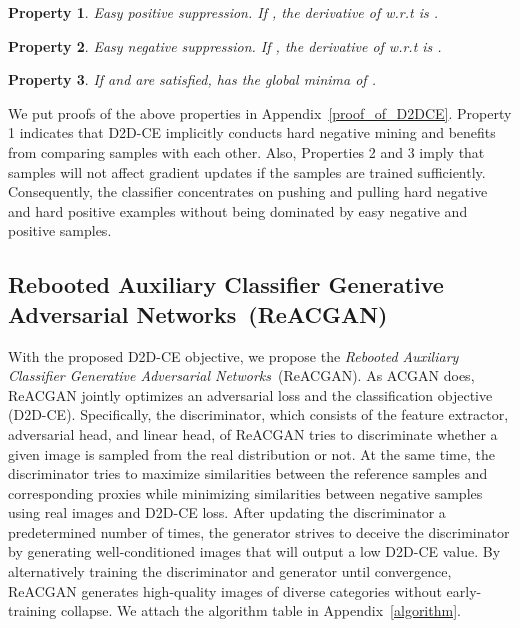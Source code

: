 \documentclass{article}
\newtheorem{property}{Property}
\begin{document}
\begin{property}
Easy positive suppression.
If , the derivative of   w.r.t  is .
\end{property}

\begin{property}
Easy negative suppression. 
If , the derivative of   w.r.t  is .
\end{property}

\begin{property}
If  and  are satisfied,  has the global minima of .
\end{property}

We put proofs of the above properties in Appendix~\ref{proof_of_D2DCE}. Property 1 indicates that D2D-CE implicitly conducts hard negative mining and benefits from comparing samples with each other. Also, Properties 2 and 3 imply that samples will not affect gradient updates if the samples are trained sufficiently. Consequently, the classifier concentrates on pushing and pulling hard negative and hard positive examples without being dominated by easy negative and positive samples.

\subsection{Rebooted Auxiliary Classifier Generative Adversarial Networks~(ReACGAN)}
With the proposed D2D-CE objective, we propose the \textit{Rebooted Auxiliary Classifier Generative Adversarial Networks}~(ReACGAN). As ACGAN does, ReACGAN jointly optimizes an adversarial loss and the classification objective (D2D-CE). Specifically, the discriminator, which consists of the feature extractor, adversarial head, and linear head, of ReACGAN tries to discriminate whether a given image is sampled from the real distribution or not. At the same time, the discriminator tries to maximize similarities between the reference samples and corresponding proxies while minimizing similarities between negative samples using real images and D2D-CE loss. After updating the discriminator a predetermined number of times, the generator strives to deceive the discriminator by generating well-conditioned images that will output a low D2D-CE value. By alternatively training the discriminator and generator until convergence, ReACGAN generates high-quality images of diverse categories without early-training collapse. We attach the algorithm table in Appendix~\ref{algorithm}. 
\end{document}
